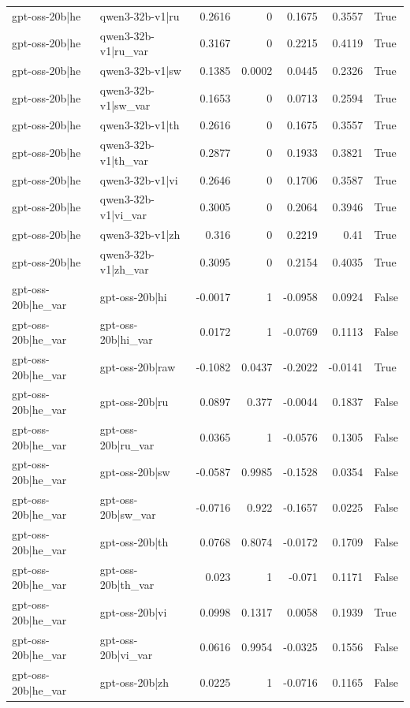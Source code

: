 \begin{table}
\begin{tabular}{l l r r r r l}
gpt-oss-20b|he & qwen3-32b-v1|ru & 0.2616 & 0 & 0.1675 & 0.3557 & True \\
gpt-oss-20b|he & qwen3-32b-v1|ru_var & 0.3167 & 0 & 0.2215 & 0.4119 & True \\
gpt-oss-20b|he & qwen3-32b-v1|sw & 0.1385 & 0.0002 & 0.0445 & 0.2326 & True \\
gpt-oss-20b|he & qwen3-32b-v1|sw_var & 0.1653 & 0 & 0.0713 & 0.2594 & True \\
gpt-oss-20b|he & qwen3-32b-v1|th & 0.2616 & 0 & 0.1675 & 0.3557 & True \\
gpt-oss-20b|he & qwen3-32b-v1|th_var & 0.2877 & 0 & 0.1933 & 0.3821 & True \\
gpt-oss-20b|he & qwen3-32b-v1|vi & 0.2646 & 0 & 0.1706 & 0.3587 & True \\
gpt-oss-20b|he & qwen3-32b-v1|vi_var & 0.3005 & 0 & 0.2064 & 0.3946 & True \\
gpt-oss-20b|he & qwen3-32b-v1|zh & 0.316 & 0 & 0.2219 & 0.41 & True \\
gpt-oss-20b|he & qwen3-32b-v1|zh_var & 0.3095 & 0 & 0.2154 & 0.4035 & True \\
gpt-oss-20b|he_var & gpt-oss-20b|hi & -0.0017 & 1 & -0.0958 & 0.0924 & False \\
gpt-oss-20b|he_var & gpt-oss-20b|hi_var & 0.0172 & 1 & -0.0769 & 0.1113 & False \\
gpt-oss-20b|he_var & gpt-oss-20b|raw & -0.1082 & 0.0437 & -0.2022 & -0.0141 & True \\
gpt-oss-20b|he_var & gpt-oss-20b|ru & 0.0897 & 0.377 & -0.0044 & 0.1837 & False \\
gpt-oss-20b|he_var & gpt-oss-20b|ru_var & 0.0365 & 1 & -0.0576 & 0.1305 & False \\
gpt-oss-20b|he_var & gpt-oss-20b|sw & -0.0587 & 0.9985 & -0.1528 & 0.0354 & False \\
gpt-oss-20b|he_var & gpt-oss-20b|sw_var & -0.0716 & 0.922 & -0.1657 & 0.0225 & False \\
gpt-oss-20b|he_var & gpt-oss-20b|th & 0.0768 & 0.8074 & -0.0172 & 0.1709 & False \\
gpt-oss-20b|he_var & gpt-oss-20b|th_var & 0.023 & 1 & -0.071 & 0.1171 & False \\
gpt-oss-20b|he_var & gpt-oss-20b|vi & 0.0998 & 0.1317 & 0.0058 & 0.1939 & True \\
gpt-oss-20b|he_var & gpt-oss-20b|vi_var & 0.0616 & 0.9954 & -0.0325 & 0.1556 & False \\
gpt-oss-20b|he_var & gpt-oss-20b|zh & 0.0225 & 1 & -0.0716 & 0.1165 & False \\

\end{tabular}
\end{table}
